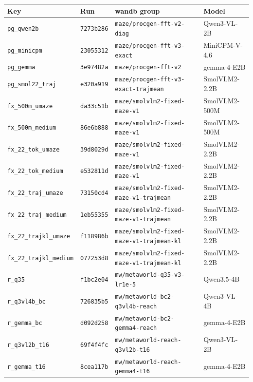 \begin{longtable}{@{}llll@{}}
\toprule
Key & Run & wandb group & Model \\
\midrule
\endhead
\texttt{pg\_qwen2b} & \texttt{7273b286} & \texttt{maze/procgen-fft-v2-diag} & Qwen3-VL-2B \\
\texttt{pg\_minicpm} & \texttt{23055312} & \texttt{maze/procgen-fft-v3-exact} & MiniCPM-V-4.6 \\
\texttt{pg\_gemma} & \texttt{3e97482a} & \texttt{maze/procgen-fft-v2} & gemma-4-E2B \\
\texttt{pg\_smol22\_traj} & \texttt{e320a919} & \texttt{maze/procgen-fft-v3-exact-trajmean} & SmolVLM2-2.2B \\
\texttt{fx\_500m\_umaze} & \texttt{da33c51b} & \texttt{maze/smolvlm2-fixed-maze-v1} & SmolVLM2-500M \\
\texttt{fx\_500m\_medium} & \texttt{86e6b888} & \texttt{maze/smolvlm2-fixed-maze-v1} & SmolVLM2-500M \\
\texttt{fx\_22\_tok\_umaze} & \texttt{39d8029d} & \texttt{maze/smolvlm2-fixed-maze-v1} & SmolVLM2-2.2B \\
\texttt{fx\_22\_tok\_medium} & \texttt{e532811d} & \texttt{maze/smolvlm2-fixed-maze-v1} & SmolVLM2-2.2B \\
\texttt{fx\_22\_traj\_umaze} & \texttt{73150cd4} & \texttt{maze/smolvlm2-fixed-maze-v1-trajmean} & SmolVLM2-2.2B \\
\texttt{fx\_22\_traj\_medium} & \texttt{1eb55355} & \texttt{maze/smolvlm2-fixed-maze-v1-trajmean} & SmolVLM2-2.2B \\
\texttt{fx\_22\_trajkl\_umaze} & \texttt{f118986b} & \texttt{maze/smolvlm2-fixed-maze-v1-trajmean-kl} & SmolVLM2-2.2B \\
\texttt{fx\_22\_trajkl\_medium} & \texttt{077253d8} & \texttt{maze/smolvlm2-fixed-maze-v1-trajmean-kl} & SmolVLM2-2.2B \\
\texttt{r\_q35} & \texttt{f1bc2e04} & \texttt{mw/metaworld-q35-v3-lr1e-5} & Qwen3.5-4B \\
\texttt{r\_q3vl4b\_bc} & \texttt{726835b5} & \texttt{mw/metaworld-bc2-q3vl4b-reach} & Qwen3-VL-4B \\
\texttt{r\_gemma\_bc} & \texttt{d092d258} & \texttt{mw/metaworld-bc2-gemma4-reach} & gemma-4-E2B \\
\texttt{r\_q3vl2b\_t16} & \texttt{69f4f4fc} & \texttt{mw/metaworld-reach-q3vl2b-t16} & Qwen3-VL-2B \\
\texttt{r\_gemma\_t16} & \texttt{8cea117b} & \texttt{mw/metaworld-reach-gemma4-t16} & gemma-4-E2B \\

\end{longtable}

